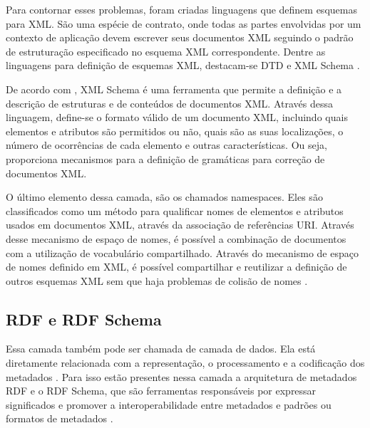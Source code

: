 Para contornar esses problemas, foram criadas linguagens que definem esquemas para XML. São uma espécie de contrato, onde todas as partes envolvidas por um contexto de aplicação devem escrever seus documentos XML seguindo o padrão de estruturação especificado no esquema XML correspondente. Dentre as linguagens para definição de esquemas XML, destacam-se DTD e XML Schema \cite{filholoscio}.

De acordo com \cite{rosa}, XML Schema é uma ferramenta que permite a definição e a descrição de estruturas e de conteúdos de documentos XML. Através dessa linguagem, define-se o formato válido de um documento XML, incluindo quais elementos e atributos são permitidos ou não, quais são as suas localizações, o número de ocorrências de cada elemento e outras características. Ou seja, proporciona mecanismos para a definição de gramáticas para correção de documentos XML.

O último elemento dessa camada, são os chamados namespaces. Eles são classificados como um método para qualificar nomes de elementos e atributos usados em documentos XML, através da associação de referências URI. Através desse mecanismo de espaço de nomes, é possível a combinação de documentos com a utilização de vocabulário compartilhado. Através do mecanismo de espaço de nomes definido em XML, é possível compartilhar e reutilizar a definição de outros esquemas XML sem que haja problemas de colisão de nomes \cite{rosa} .

\subsection{RDF e RDF Schema}

Essa camada também pode ser chamada de camada de dados. Ela está diretamente relacionada com a representação, o processamento e a codificação dos metadados \cite{vesu}. Para isso estão presentes nessa camada a arquitetura de metadados RDF e o RDF Schema, que são ferramentas responsáveis por expressar significados e promover a interoperabilidade entre metadados e padrões ou formatos de metadados \cite{santarem}.